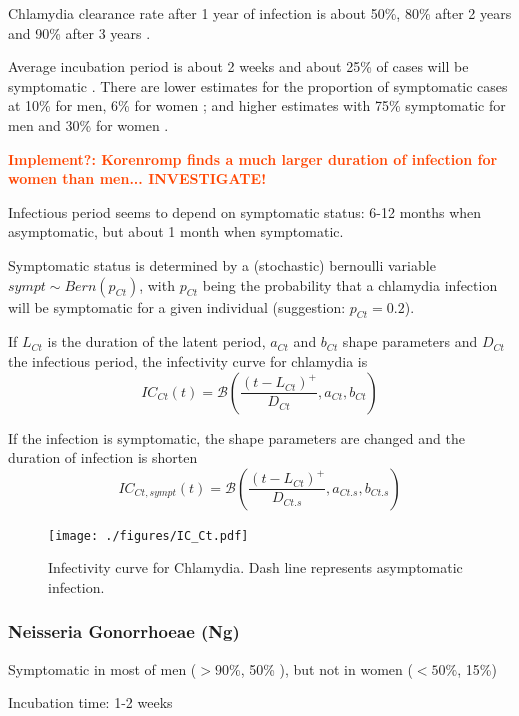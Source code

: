 \documentclass[11pt, onecolumn]{article}
\newcommand{\warning}[1]{\textbf{\textcolor{OrangeRed}{#1}}}
\begin{document}
Chlamydia clearance rate after 1 year of infection is about 50\%, 80\% after 2 years and 90\% after 3 years \cite{Geisler:2010bc}.

Average incubation period is about 2 weeks and about 25\% of cases will be symptomatic \cite{Althaus:2011dc}. There are lower estimates for the proportion of symptomatic cases at 10\% for men, 6\% for women \cite{Korenromp:2002gt}; and higher estimates with 75\% symptomatic for men and 30\% for women \cite{Kretzschmar:1996ur}.

\warning{Implement?: Korenromp\cite{Korenromp:2002gt} finds a much larger duration of infection for women than men... INVESTIGATE!}

Infectious period seems to depend on symptomatic status: 6-12 months when asymptomatic, but about 1 month when symptomatic\cite{Kretzschmar:2009cd}.

Symptomatic status is determined by a (stochastic) bernoulli variable $sympt\sim Bern(p_{Ct})$, with $p_{Ct}$ being the probability that a chlamydia infection will be symptomatic for a given individual (suggestion: $p_{Ct}=0.2$).

If $L_{Ct}$ is the duration of the latent period, $a_{Ct}$ and $b_{Ct}$ shape parameters and $D_{Ct}$ the infectious period, the infectivity curve for chlamydia is
$$IC_{Ct}(t) = \mathcal{B}\left(\frac{(t-L_{Ct})^+}{D_{Ct}},a_{Ct},b_{Ct}\right)$$

If the infection is symptomatic, the shape parameters are changed and the duration of infection is shorten
$$IC_{Ct,sympt}(t) = \mathcal{B}\left(\frac{(t-L_{Ct})^+}{D_{Ct.s}},a_{Ct.s},b_{Ct.s}\right)$$

\begin{figure}[!ht]
\centering
    \texttt{[image: ./figures/IC\_Ct.pdf]}
\caption{Infectivity curve for Chlamydia. Dash line represents asymptomatic infection.}
\label{fig:ICCt}
\end{figure}



\subsubsection{Neisseria Gonorrhoeae (Ng)}

 Symptomatic in most of men ($> 90\%$\cite{Ison:2011eg,Kretzschmar:1996ur}, 50\%\cite{Korenromp:2002gt} ), but not in women ($< 50\%$\cite{Ison:2011eg,Kretzschmar:1996ur}, 15\%\cite{Korenromp:2002gt}) 
 
 Incubation time: 1-2 weeks\cite{Kretzschmar:1996ur}
 
\end{document}
